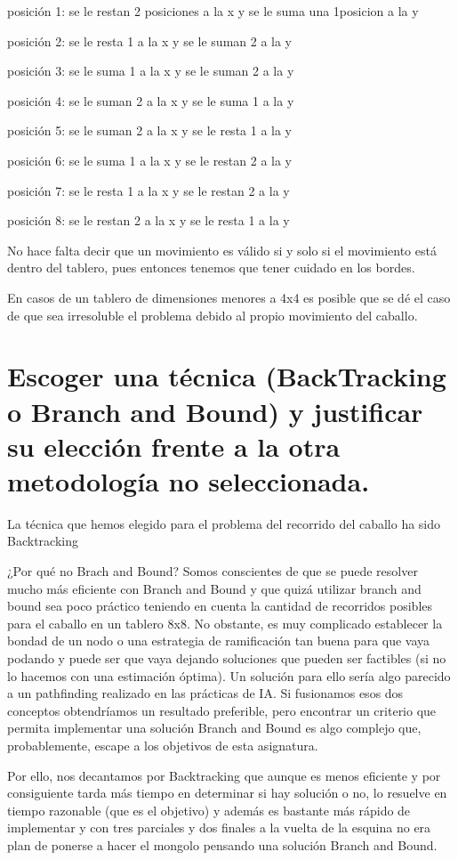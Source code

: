 \documentclass[a4paper, 11pt]{article}
\begin{document}
				posición 1: se le restan 2 posiciones a la x y se le suma una 1posicion a la y
				
				posición 2: se le resta 1 a la x y se le suman 2 a la y
				
				posición 3: se le suma 1 a la x y se le suman 2 a la y
				
				posición 4: se le suman 2 a la x y se le suma 1 a la y
				
				posición 5: se le suman 2 a la x y se le resta 1 a la y
				
				posición 6: se le suma 1 a la x y se le restan 2 a la y
				
				posición 7: se le resta 1 a la x y se le restan 2 a la y
				
				posición 8: se le restan 2 a la x y se le resta 1 a la y 
				
				No hace falta decir que un movimiento es válido si y solo si el movimiento está dentro del tablero, pues entonces tenemos que tener cuidado en los bordes.
				
				En casos de un tablero de dimensiones menores a 4x4 es posible que se dé el caso de que sea irresoluble el problema debido al propio movimiento del caballo.

\section{Escoger una técnica (BackTracking o Branch and Bound) y justificar su elección frente a la otra metodología no seleccionada.}	
La técnica que hemos elegido para el problema del recorrido del caballo ha sido Backtracking

¿Por qué no Brach and Bound?
Somos conscientes de que se puede resolver mucho más eficiente con Branch and Bound y que quizá utilizar branch and bound sea poco práctico teniendo en cuenta la cantidad de recorridos posibles para el caballo en un tablero 8x8. No obstante, es muy complicado establecer la bondad de un nodo o una estrategia de ramificación tan buena para que vaya podando y puede ser que vaya dejando soluciones que pueden ser factibles (si no lo hacemos con una estimación óptima).
Un solución para ello sería algo parecido a un pathfinding realizado en las prácticas de IA. Si fusionamos esos dos conceptos obtendríamos un resultado preferible, pero encontrar un criterio que permita implementar una solución Branch and Bound es algo complejo que, probablemente, escape a los objetivos de esta asignatura.

Por ello, nos decantamos por Backtracking que aunque es menos eficiente y por consiguiente tarda más tiempo en determinar si hay solución o no, lo resuelve en tiempo razonable (que es el objetivo) y además es bastante más rápido de implementar y con tres parciales y dos finales a la vuelta de la esquina no era plan de ponerse a hacer el mongolo pensando una solución Branch and Bound.
\end{document}
